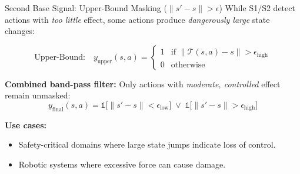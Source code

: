 \documentclass[11pt,aspectratio=169]{beamer}
\begin{document}
\begin{frame}{Second Base Signal: Upper-Bound Masking ($\|s' - s\| > \epsilon$)}
    While S1/S2 detect actions with \textit{too little} effect, some actions produce \textit{dangerously large} state changes:

    \begin{equation}
        \text{Upper-Bound:} \quad y_{\text{upper}}(s, a) =
        \begin{cases}
            1 & \text{if } \|\mathcal{T}(s, a) - s\| > \epsilon_{\text{high}} \\
            0 & \text{otherwise}
        \end{cases}
    \end{equation}

    \textbf{Combined band-pass filter:} Only actions with \textit{moderate, controlled} effect remain unmasked:
    \begin{equation}
        y_{\text{final}}(s, a) = \mathbb{1}\big[\|s' - s\| < \epsilon_{\text{low}}\big] \;\lor\; \mathbb{1}\big[\|s' - s\| > \epsilon_{\text{high}}\big]
    \end{equation}

    \textbf{Use cases:}
    \begin{itemize}
        \item Safety-critical domains where large state jumps indicate loss of control.
        \item Robotic systems where excessive force can cause damage.
    \end{itemize}
\end{frame}
\end{document}
